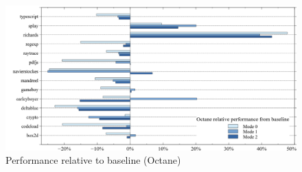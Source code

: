 \begin{figure}[ht]
  \begin{center}
    \centering
    \includegraphics[width=1.0\textwidth]{figures/octane_variation.png}
    \caption{Performance relative to baseline (Octane)}
    \label{f:octane_variation}
  \end{center}
\end{figure}
\clearpage
